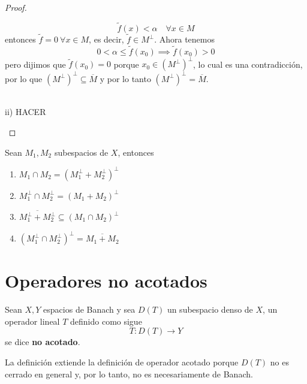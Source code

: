\begin{prop}
\begin{proof}
\begin{description}
\begin{equation*}
            \tilde{f}(x) < \alpha \quad \forall x \in M
        \end{equation*}
        entonces $\tilde{f}=0 \ \forall x \in M$, es decir, $\tilde{f}\in M^{\perp}$. Ahora tenemos 
        \begin{equation*}
            0 < \alpha \leq \tilde{f}(x_0) \implies \tilde{f}(x_0) >0
        \end{equation*}
        pero dijimos que $\tilde{f}(x_0) = 0$ porque $x_0 \in (M^\perp)^\perp$, lo cual es una contradicción, por lo que $(M^\perp)^\perp \subseteq \overline{M}$ y por lo tanto $(M^\perp)^\perp = \overline{M}$.
         \\ \\
        \item ii) HACER %
    \end{description}
\end{proof}
\end{prop}


\begin{prop}
    Sean $M_1, M_2$ subespacios de $X$, entonces
    \begin{enumerate}
        \item $M_1 \cap M_2 = (M_1^\perp + M_2^\perp)^\perp$
        \item $M_1^\perp \cap M_2^\perp = (M_1 + M_2)^\perp$
        \item $\overline{M_1^\perp + M_2^\perp} \subseteq (M_1 \cap M_2)^\perp$
        \item $(M_1^\perp \cap M_2^\perp)^\perp = \overline{M_1 + M_2}$
    \end{enumerate}
\end{prop}


\section{Operadores no acotados}

\begin{definicion}
    Sean $X,Y$ espacios de Banach y sea $D(T)$ un subespacio denso de $X$, un operador lineal $T$ definido como sigue
    \begin{equation*}
        T: D(T) \to Y
    \end{equation*}
    se dice \textbf{no acotado}.
\end{definicion}

\begin{observacion}
    La definición extiende la definición de operador acotado porque $D(T)$ no es cerrado en general y, por lo tanto, no es necesariamente de Banach. 
\end{observacion}


